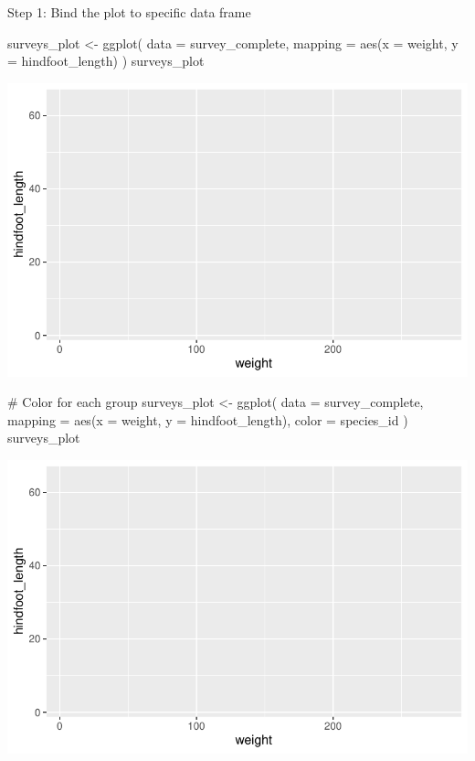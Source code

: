 \documentclass[
  letterpaper,
  DIV=11,
  numbers=noendperiod]{scrreprt}
\newenvironment{Shaded}{\begin{snugshade}}{\end{snugshade}}
\newcommand{\AttributeTok}[1]{\textcolor[rgb]{0.40,0.45,0.13}{#1}}
\newcommand{\CommentTok}[1]{\textcolor[rgb]{0.37,0.37,0.37}{#1}}
\newcommand{\FunctionTok}[1]{\textcolor[rgb]{0.28,0.35,0.67}{#1}}
\newcommand{\NormalTok}[1]{\textcolor[rgb]{0.00,0.23,0.31}{#1}}
\newcommand{\OtherTok}[1]{\textcolor[rgb]{0.00,0.23,0.31}{#1}}
\begin{document}
Step 1: Bind the plot to specific data frame

\begin{Shaded}
\begin{Highlighting}[]
\NormalTok{surveys\_plot }\OtherTok{\textless{}{-}} \FunctionTok{ggplot}\NormalTok{(}
  \AttributeTok{data =}\NormalTok{ survey\_complete,}
  \AttributeTok{mapping =} \FunctionTok{aes}\NormalTok{(}\AttributeTok{x =}\NormalTok{ weight, }\AttributeTok{y =}\NormalTok{ hindfoot\_length)}
\NormalTok{)}
\NormalTok{surveys\_plot}
\end{Highlighting}
\end{Shaded}

\includegraphics{src/notebooks/r_files/figure-pdf/unnamed-chunk-48-1.pdf}

\begin{Shaded}
\begin{Highlighting}[]
\CommentTok{\# Color for each group}
\NormalTok{surveys\_plot }\OtherTok{\textless{}{-}} \FunctionTok{ggplot}\NormalTok{(}
  \AttributeTok{data =}\NormalTok{ survey\_complete,}
  \AttributeTok{mapping =} \FunctionTok{aes}\NormalTok{(}\AttributeTok{x =}\NormalTok{ weight, }\AttributeTok{y =}\NormalTok{ hindfoot\_length),}
  \AttributeTok{color =}\NormalTok{ species\_id}
\NormalTok{)}
\NormalTok{surveys\_plot}
\end{Highlighting}
\end{Shaded}

\includegraphics{src/notebooks/r_files/figure-pdf/unnamed-chunk-48-2.pdf}
\end{document}
